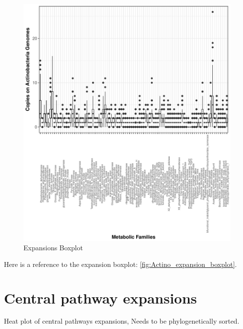 \documentclass[12pt,twoside]{reedthesis}
\begin{document}
  \begin{figure}[h!tbp]
  \centering
  \includegraphics[angle = 0,scale = 1]{chapter2/Actinobacteria/expansion_plotActinos.pdf}
  \caption[Expansions Boxplot]{\normalsize{Expansions Boxplot}}
  \label{fig:Actino_expansion_boxplot}
  \end{figure}
  
  Here is a reference to the expansion boxplot:
  \autoref{fig:Actino_expansion_boxplot}.\\
  \clearpage 
  
  \section{Central pathway expansions}\label{central-pathway-expansions-1}
  
  Heat plot of central pathways expansions, Needs to be phylogenetically
  sorted.
  
\end{document}
